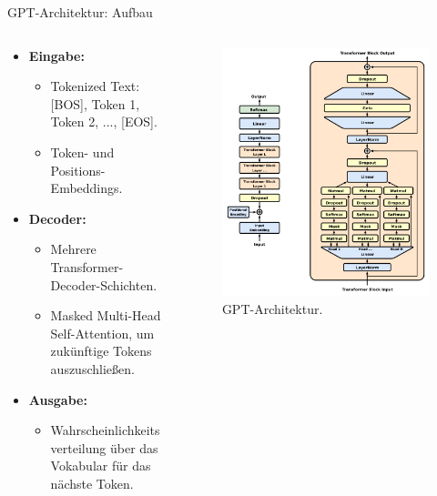 \documentclass[aspectratio=1610, xcolor=dvipsnames, 9pt]{beamer}
\begin{document}
\begin{frame}{GPT-Architektur: Aufbau}
  \begin{columns}
    \begin{column}{0.5\textwidth}
      \begin{itemize}
        \item \textbf{Eingabe:}
          \begin{itemize}
            \item Tokenized Text: [BOS], Token 1, Token 2, ..., [EOS].
            \item Token- und Positions-Embeddings.
          \end{itemize}
        \item \textbf{Decoder:}
          \begin{itemize}
            \item Mehrere Transformer-Decoder-Schichten.
            \item Masked Multi-Head Self-Attention, um zukünftige Tokens auszuschließen.
          \end{itemize}
        \item \textbf{Ausgabe:}
          \begin{itemize}
            \item Wahrscheinlichkeitsverteilung über das Vokabular für das nächste Token.
          \end{itemize}
      \end{itemize}
    \end{column}
    \begin{column}{0.5\textwidth}
      \begin{figure}
        \centering
        \includegraphics[width=0.8\columnwidth]{images/Full_GPT_architecture.png}
        \caption{GPT-Architektur.}
      \end{figure}
    \end{column}
  \end{columns}
\end{frame}
\end{document}
